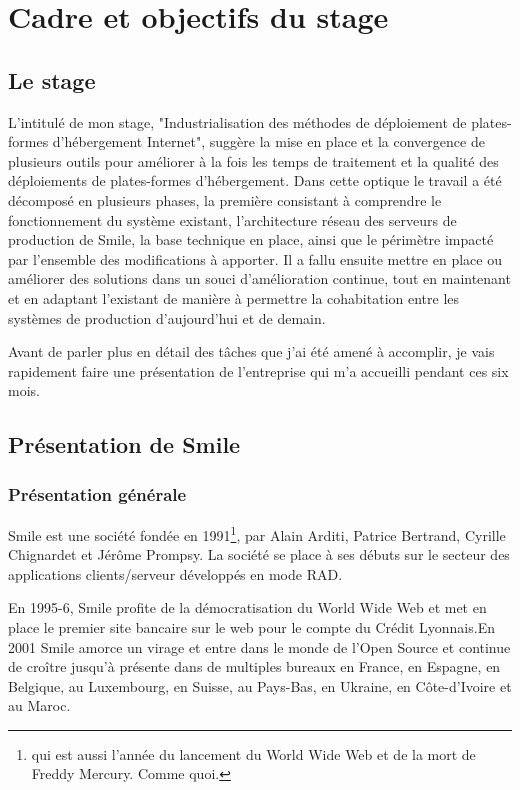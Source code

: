 \documentclass[14 pt]{extreport}
\begin{document}
\section{Cadre et objectifs du stage}

\subsection{Le stage}L'intitulé de mon stage, "Industrialisation des méthodes de déploiement de plates-formes d'hébergement Internet", suggère la mise en place et la convergence de plusieurs outils pour améliorer à la fois les temps de traitement et la qualité des déploiements de plates-formes d'hébergement. Dans cette optique le travail a été décomposé en plusieurs phases, la première consistant à comprendre le fonctionnement du système existant, l'architecture réseau des serveurs de production de Smile, la base technique en place, ainsi que le périmètre impacté par l'ensemble des modifications à apporter. Il a fallu ensuite mettre en place ou améliorer des solutions dans un souci d'amélioration continue, tout en maintenant et en adaptant l'existant de manière à permettre la cohabitation entre les systèmes de production d'aujourd'hui et de demain.

Avant de parler plus en détail des tâches que j'ai été amené à accomplir, je vais rapidement faire une présentation de l'entreprise qui m'a accueilli pendant ces six mois.

\subsection{Présentation de Smile}

\subsubsection{Présentation générale}
Smile est une société fondée en 1991\footnote{qui est aussi l'année du lancement du World Wide Web et de la mort de Freddy Mercury. Comme quoi.}, par Alain Arditi, Patrice Bertrand, Cyrille Chignardet et Jérôme Prompsy. La société se place à ses débuts sur le secteur des applications clients/serveur développés en mode RAD.

En 1995-6, Smile profite de la démocratisation du World Wide Web et met en place le premier site bancaire sur le web pour le compte du Crédit Lyonnais.En 2001 Smile amorce un virage et entre dans le monde de l'Open Source et continue de croître jusqu'à présente dans de multiples bureaux en France, en Espagne, en Belgique, au Luxembourg, en Suisse, au Pays-Bas, en Ukraine, en Côte-d'Ivoire et au Maroc.
\end{document}
